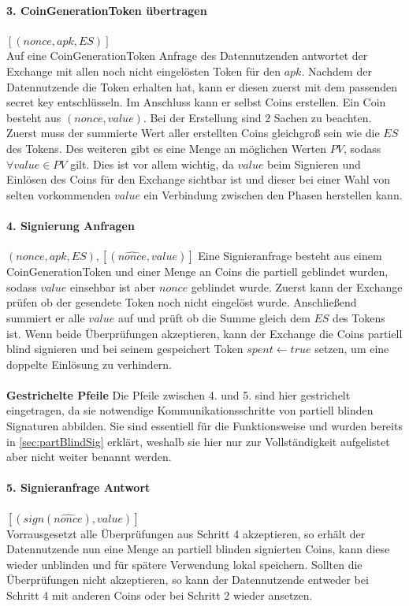 \documentclass[11pt,a4paper]{scrreprt}
\begin{document}
\paragraph{3. CoinGenerationToken übertragen} $[(nonce, apk, ES)]$\\
Auf eine CoinGenerationToken Anfrage des Datennutzenden antwortet der Exchange mit allen noch nicht eingelösten Token für den $apk$. Nachdem der Datennutzende die Token erhalten hat, kann er diesen zuerst mit dem passenden secret key entschlüsseln. Im Anschluss kann er selbst Coins erstellen. Ein Coin besteht aus $(nonce, value)$. Bei der Erstellung sind 2 Sachen zu beachten. Zuerst muss der summierte Wert aller erstellten Coins gleichgroß sein wie die $ES$ des Tokens. Des weiteren gibt es eine Menge an möglichen Werten $PV$, sodass $\forall value\in  PV$ gilt. Dies ist vor allem wichtig, da $value$ beim Signieren und Einlösen des Coins für den Exchange sichtbar ist und dieser bei einer Wahl von selten vorkommenden $value$ ein Verbindung zwischen den Phasen herstellen kann.

\paragraph{4. Signierung Anfragen} $(nonce, apk, ES), [(\widehat{nonce},value)]$
Eine Signieranfrage besteht aus einem CoinGenerationToken und einer Menge an Coins die partiell geblindet wurden, sodass $value$ einsehbar ist aber $nonce$ geblindet wurde. Zuerst kann der Exchange prüfen ob der gesendete Token noch nicht eingelöst wurde. Anschließend summiert er alle $value$ auf und prüft ob die Summe gleich dem $ES$ des Tokens ist. Wenn beide Überprüfungen akzeptieren, kann der Exchange die Coins partiell blind signieren und bei seinem gespeichert Token $spent \leftarrow true$ setzen, um eine doppelte Einlösung zu verhindern.\\\\

\textbf{Gestrichelte Pfeile}
Die Pfeile zwischen 4. und 5. sind hier gestrichelt eingetragen, da sie notwendige Kommunikationsschritte von partiell blinden Signaturen abbilden. Sie sind essentiell für die Funktionsweise und wurden bereits in \ref{sec:partBlindSig} erklärt, weshalb sie hier nur zur Vollständigkeit aufgelistet aber nicht weiter benannt werden.

\paragraph{5. Signieranfrage Antwort} $[(sign(\widehat{nonce}),value)]$ \\
Vorrausgesetzt alle Überprüfungen aus Schritt 4 akzeptieren, so erhält der Datennutzende nun eine Menge an partiell blinden signierten Coins, kann diese wieder unblinden und für spätere Verwendung lokal speichern. Sollten die Überprüfungen nicht akzeptieren, so kann der Datennutzende entweder bei Schritt 4 mit anderen Coins oder bei Schritt 2 wieder ansetzen.
\end{document}
